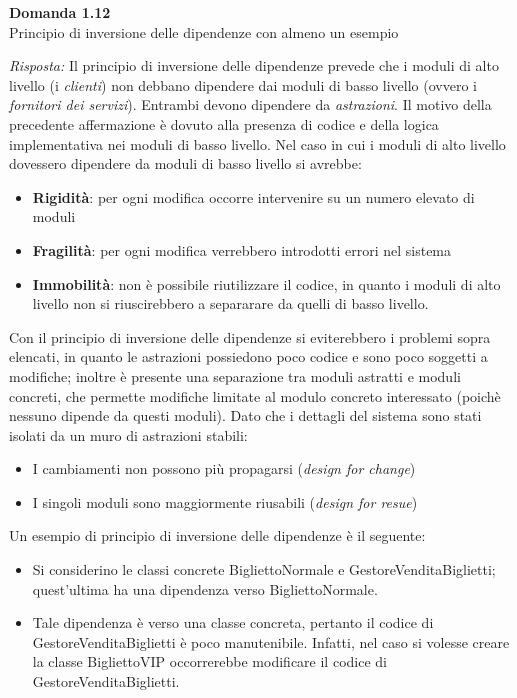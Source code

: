 \documentclass{article}
\newenvironment{problem}[2][Domanda]
    { \begin{mdframed}[backgroundcolor=gray!20] \textbf{#1 #2} \\}
    {  \end{mdframed}}
\newenvironment{solution}
    {\textit{Risposta:}}
    {}
\begin{document}
\begin{problem}{1.12}
Principio di inversione delle dipendenze con almeno un esempio
\end{problem}
\begin{solution}
Il principio di inversione delle dipendenze prevede che i moduli di alto livello (i \textit{clienti}) non debbano dipendere dai moduli di basso livello (ovvero i \textit{fornitori dei servizi}). Entrambi devono dipendere da \textit{astrazioni}.
\newline
Il motivo della precedente affermazione è dovuto alla presenza di codice e della logica implementativa nei moduli di basso livello. Nel caso in cui i moduli di alto livello dovessero dipendere da moduli di basso livello si avrebbe:
\begin{itemize}
	\item \textbf{Rigidità}: per ogni modifica occorre intervenire su un numero elevato di moduli
	\item \textbf{Fragilità}: per ogni modifica verrebbero introdotti errori nel sistema
	\item \textbf{Immobilità}: non è possibile riutilizzare il codice, in quanto i moduli di alto livello non si riuscirebbero a separarare da quelli di basso livello.
\end{itemize}
Con il principio di inversione delle dipendenze si eviterebbero i problemi sopra elencati, in quanto le astrazioni possiedono poco codice e sono poco soggetti a modifiche; inoltre è presente una separazione tra moduli astratti e moduli concreti, che permette modifiche limitate al modulo concreto interessato (poichè nessuno dipende da questi moduli).
Dato che i dettagli del sistema sono stati isolati da un muro di astrazioni stabili:
\begin{itemize}
	\item I cambiamenti non possono più propagarsi (\textit{design for change})
	\item I singoli moduli sono maggiormente riusabili (\textit{design for resue})
\end{itemize}
Un esempio di principio di inversione delle dipendenze è il seguente:
\begin{itemize}
	\item Si considerino le classi concrete BigliettoNormale e GestoreVenditaBiglietti; quest'ultima ha una dipendenza verso BigliettoNormale.
	\item Tale dipendenza è verso una classe concreta, pertanto il codice di GestoreVenditaBiglietti è poco manutenibile.
	\newline Infatti, nel caso si volesse creare la classe BigliettoVIP occorrerebbe modificare il codice di GestoreVenditaBiglietti.

\end{itemize}
\end{solution}
\end{document}
